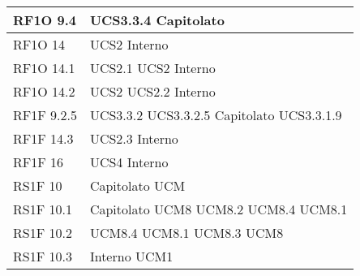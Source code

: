 \begin{center}
\begin{longtable}{ | p{5cm} | p{5cm} |}
        RF1O 9.4 &  UCS3.3.4 \newline  Capitolato \newline  \\ \hline      
        RF1O 14 &  UCS2 \newline  Interno \newline  \\ \hline      
        RF1O 14.1 &  UCS2.1 \newline  UCS2 \newline  Interno \newline  \\ \hline      
        RF1O 14.2 &  UCS2 \newline  UCS2.2 \newline  Interno \newline  \\ \hline      
        RF1F 9.2.5 &  UCS3.3.2 \newline  UCS3.3.2.5 \newline  Capitolato \newline  UCS3.3.1.9 \newline  \\ \hline      
        RF1F 14.3 &  UCS2.3 \newline  Interno \newline  \\ \hline      
        RF1F 16 &  UCS4 \newline  Interno \newline  \\ \hline      
        RS1F 10 &  Capitolato \newline  UCM \newline  \\ \hline      
        RS1F 10.1 &  Capitolato \newline  UCM8 \newline  UCM8.2 \newline  UCM8.4 \newline  UCM8.1 \newline  \\ \hline      
        RS1F 10.2 &  UCM8.4 \newline  UCM8.1 \newline  UCM8.3 \newline  UCM8 \newline  \\ \hline      
        RS1F 10.3 &  Interno \newline  UCM1 \newline  \\ \hline      

\end{longtable}
\end{center}
